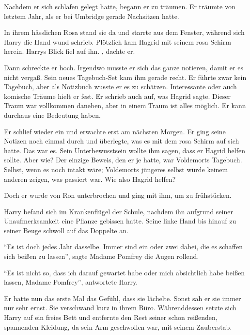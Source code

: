 Nachdem er sich schlafen gelegt hatte, begann er zu träumen. Er träumte von letztem Jahr, als er bei Umbridge gerade Nachsitzen hatte.

\begin{traum}
In ihrem hässlichen Rosa stand sie da und starrte aus dem Fenster, während sich Harry die Hand wund schrieb. Plötzlich kam Hagrid mit seinem rosa Schirm herein. Harrys Blick fiel auf ihn. , dachte er.
\end{traum}

Dann schreckte er hoch. Irgendwo musste er sich das ganze notieren, damit er es nicht vergaß. Sein neues Tagebuch-Set kam ihm gerade recht. Er führte zwar kein Tagebuch, aber als Notizbuch wusste er es zu schätzen. Interessante oder auch komische Träume hielt er fest. Er schrieb auch auf, was Hagrid sagte.  Dieser Traum war vollkommen daneben, aber in einem Traum ist alles möglich. Er kann durchaus eine Bedeutung haben.

Er schlief wieder ein und erwachte erst am nächsten Morgen. Er ging seine Notizen noch einmal durch und überlegte, was es mit dem rosa Schirm auf sich hatte.  Das war es. Sein Unterbewusstsein wollte ihm sagen, dass er Hagrid helfen sollte. Aber wie? Der einzige Beweis, den er je hatte, war Voldemorts Tagebuch. Selbst, wenn es noch intakt wäre; Voldemorts jüngeres selbst würde keinem anderen zeigen, was passiert war. Wie also Hagrid helfen?

Doch er wurde von Ron unterbrochen und ging mit ihm, um zu frühstücken.

\trenn

Harry befand sich im Krankenflügel der Schule, nachdem ihn aufgrund seiner Unaufmerksamkeit eine Pflanze gebissen hatte. Seine linke Hand bis hinauf zu seiner Beuge schwoll auf das Doppelte an.

\enquote{Es ist doch jedes Jahr dasselbe. Immer sind ein oder zwei dabei, die es schaffen sich beißen zu lassen}, sagte Madame Pomfrey die Augen rollend.

\enquote{Es ist nicht so, dass ich darauf gewartet habe oder mich absichtlich habe beißen lassen, Madame Pomfrey}, antwortete Harry.

Er hatte nun das erste Mal das Gefühl, dass sie lächelte. Sonst sah er sie immer nur sehr ernst. Sie verschwand kurz in ihrem Büro. Währenddessen setzte sich Harry auf ein freies Bett und entfernte den Rest seiner schon reißenden, spannenden Kleidung, da sein Arm geschwollen war, mit seinem Zauberstab.

